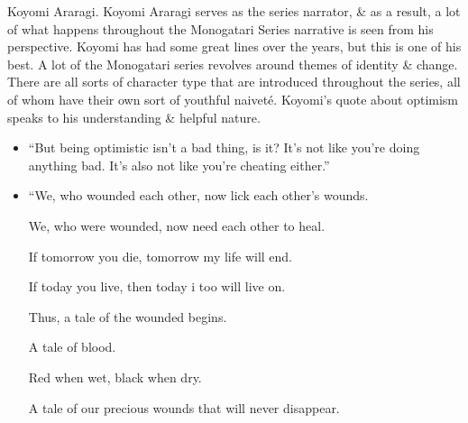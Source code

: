 \documentclass{article}
\begin{document}
\begin{enumerate}
    {\sf Koyomi Araragi.} Koyomi Araragi serves as the series narrator, \& as a result, a lot of what happens throughout the Monogatari Series narrative is seen from his perspective. Koyomi has had some great lines over the years, but this is one of his best. A lot of the Monogatari series revolves around themes of identity \& change. There are all sorts of character type that are introduced throughout the series, all of whom have their own sort of youthful naiveté. Koyomi's quote about optimism speaks to his understanding \& helpful nature.
    \begin{itemize}
    	\item ``But being optimistic isn't a bad thing, is it? It's not like you're doing anything bad. It's also not like you're cheating either.''
    	\item ``We, who wounded each other, now lick each other's wounds.
    	
    	We, who were wounded, now need each other to heal.
    	
    	If tomorrow you die, tomorrow my life will end.
    	
    	If today you live, then today i too will live on.
    	
    	Thus, a tale of the wounded begins.
    	
    	A tale of blood.
    	
    	Red when wet, black when dry.
    	
    	A tale of our precious wounds that will never disappear.
    	

\end{itemize}
\end{enumerate}
\end{document}
